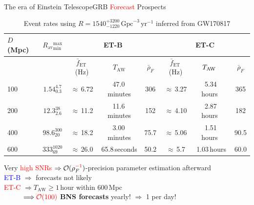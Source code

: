 \documentclass[xcolor=dvipsnames,t]{beamer}
\newcommand{\red}[1]{\textcolor{red}{#1}}
\newcommand{\bl}[1]{\textcolor{blue}{#1}}
\newcommand{\ord}{\mathcal{O}}
\newcommand\T{\rule{0pt}{2.6ex}}       %
\newcommand\B{\rule[-1.2ex]{0pt}{0pt}} %
\begin{document}
\begin{frame}{The era of Einstein Telescope}{GRB \red{Forecast} Prospects } 
  \vspace{-8mm}
  \begin{footnotesize}
  \begin{table}[h]
  \centering
  \begin{tabular}{lccccccc}
  \hline\hline
  $D\,$(Mpc) & $R_\text{av}{}^\text{max}_\text{min} $ &  \multicolumn{3}{c}{ET-B}  & \multicolumn{3}{c}{ET-C}\T\B\\
  \hline
  {}& {} & $\bar{f}_\text{ET}\,$(Hz) & \hspace{2mm} $T_\text{AW}$ \hspace{2mm} & $\bar{\rho}_{F}$  & $\bar{f}_\text{ET}\,$(Hz) & \hspace{2mm} $T_\text{AW}\hspace{2mm}$& $\bar{\rho}_{F}$\T\B\\
  100 & $ 1.54^{4.7}_{0.3}$ & $\approx\,$6.72 &  47.0\,minutes & 306  & $\approx\,$3.27 & 5.34\,hours\ & 365\T\\
  200 &  $ 12.3^{38}_{2.6} $ & $\approx\,$11.2 & 11.6\,minutes & 152  & $\approx\,$4.10 & 2.87\,hours\ & 182 \\
  400 &$ 98.6^{300}_{20} $ & $\approx\,$18.2 & 3.00\,minutes & 75.7  & $\approx\,$5.06 & 1.51\,hours\ & 90.5\\
  600 & $ 333^{1020}_{69} $ & $\approx\,$26.0  &65.8\,seconds & 50.2 &    $\approx\,$5.7 & 1.03\,hours & 60.0  \\
  \hline\hline
  \end{tabular}
  \caption*{Event rates using $R=1540^{+3200}_{-1220}\,\text{Gpc}^{-3}\,\text{yr}^{-1}$ inferred from GW170817}
  \end{table}
  \end{footnotesize}
  \vspace{-3mm}
  Very \red{high SNRs} $\Rightarrow \ord(\rho_F^{\red{-1}})$-precision parameter estimation afterward \\
  \vspace{2mm}
  \bl{ET-B} $\Longrightarrow $ forecasts not likely \\
  \vspace{2mm}
  \red{ET-C} $\Longrightarrow T_\text{AW} \ge 1\,$hour within 600\,Mpc\\
  \vspace{1mm}
  \textcolor{white}{ET-C} $\Longrightarrow \red{\ord(100)}$ {\bf BNS forecasts} yearly! $\Rightarrow $ 1 per day!\\

\end{frame}
\end{document}

